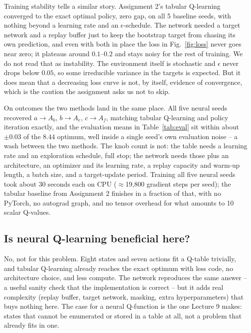 \documentclass[conference]{IEEEtran}
\begin{document}
Training stability tells a similar story. Assignment 2's tabular
Q-learning converged to the exact optimal policy, zero gap, on all 5
baseline seeds, with nothing beyond a learning rate and an
$\epsilon$-schedule. The network needed a target network and a replay
buffer just to keep the bootstrap target from chasing its own prediction,
and even with both in place the loss in Fig.~\ref{fig:loss} never goes
near zero; it plateaus around $0.1$--$0.2$ and stays noisy for the rest of
training. We do not read that as instability. The environment itself is
stochastic and $\epsilon$ never drops below $0.05$, so some irreducible
variance in the targets is expected. But it does mean that a decreasing
loss curve is not, by itself, evidence of convergence, which is the
caution the assignment asks us not to skip.

On outcomes the two methods land in the same place. All five neural
seeds recovered $a{\to}A_b$, $b{\to}A_e$, $c{\to}A_f$, matching tabular
Q-learning and policy iteration exactly, and the evaluation means in
Table~\ref{tab:eval} sit within about $\pm0.03$ of the $8.44$ optimum,
well inside a single seed's own evaluation noise -- a wash between the
two methods. The knob count is not: the table needs a learning rate and
an exploration schedule, full stop; the network needs those plus an
architecture, an optimizer and its learning rate, a replay capacity and
warm-up length, a batch size, and a target-update period. Training all
five neural seeds took about 30 seconds each on CPU ($\approx$19,800
gradient steps per seed); the tabular baseline from Assignment 2 finishes
in a fraction of that, with no PyTorch, no autograd graph, and no tensor
overhead for what amounts to 10 scalar Q-values.

\subsection{Is neural Q-learning beneficial here?}
No, not for this problem. Eight states and seven actions fit a Q-table
trivially, and tabular Q-learning already reaches the exact optimum with
less code, no architecture choice, and less compute. The network
reproduces the same answer -- a useful sanity check that the
implementation is correct -- but it adds real complexity (replay buffer,
target network, masking, extra hyperparameters) that buys nothing here.
The case for a neural Q-function is the one Lecture 9 makes: states that
cannot be enumerated or stored in a table at all, not a problem that
already fits in one.
\end{document}

